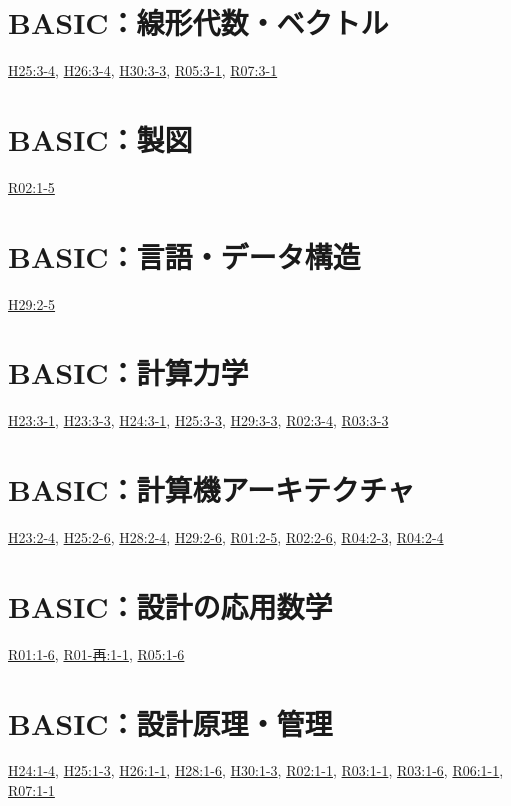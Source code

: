 \section{BASIC：線形代数・ベクトル}
\hyperref[q:h25-reg-basic-3-4]{H25:3-4}, \hyperref[q:h26-reg-basic-3-4]{H26:3-4}, \hyperref[q:h30-reg-basic-3-3]{H30:3-3}, \hyperref[q:r05-reg-basic-3-1]{R05:3-1}, \hyperref[q:r07-reg-basic-3-1]{R07:3-1}
\section{BASIC：製図}
\hyperref[q:r02-reg-basic-1-5]{R02:1-5}
\section{BASIC：言語・データ構造}
\hyperref[q:h29-reg-basic-2-5]{H29:2-5}
\section{BASIC：計算力学}
\hyperref[q:h23-reg-basic-3-1]{H23:3-1}, \hyperref[q:h23-reg-basic-3-3]{H23:3-3}, \hyperref[q:h24-reg-basic-3-1]{H24:3-1}, \hyperref[q:h25-reg-basic-3-3]{H25:3-3}, \hyperref[q:h29-reg-basic-3-3]{H29:3-3}, \hyperref[q:r02-reg-basic-3-4]{R02:3-4}, \hyperref[q:r03-reg-basic-3-3]{R03:3-3}
\section{BASIC：計算機アーキテクチャ}
\hyperref[q:h23-reg-basic-2-4]{H23:2-4}, \hyperref[q:h25-reg-basic-2-6]{H25:2-6}, \hyperref[q:h28-reg-basic-2-4]{H28:2-4}, \hyperref[q:h29-reg-basic-2-6]{H29:2-6}, \hyperref[q:r01-reg-basic-2-5]{R01:2-5}, \hyperref[q:r02-reg-basic-2-6]{R02:2-6}, \hyperref[q:r04-reg-basic-2-3]{R04:2-3}, \hyperref[q:r04-reg-basic-2-4]{R04:2-4}
\section{BASIC：設計の応用数学}
\hyperref[q:r01-reg-basic-1-6]{R01:1-6}, \hyperref[q:r01-ret-basic-1-1]{R01-再:1-1}, \hyperref[q:r05-reg-basic-1-6]{R05:1-6}
\section{BASIC：設計原理・管理}
\hyperref[q:h24-reg-basic-1-4]{H24:1-4}, \hyperref[q:h25-reg-basic-1-3]{H25:1-3}, \hyperref[q:h26-reg-basic-1-1]{H26:1-1}, \hyperref[q:h28-reg-basic-1-6]{H28:1-6}, \hyperref[q:h30-reg-basic-1-3]{H30:1-3}, \hyperref[q:r02-reg-basic-1-1]{R02:1-1}, \hyperref[q:r03-reg-basic-1-1]{R03:1-1}, \hyperref[q:r03-reg-basic-1-6]{R03:1-6}, \hyperref[q:r06-reg-basic-1-1]{R06:1-1}, \hyperref[q:r07-reg-basic-1-1]{R07:1-1}

